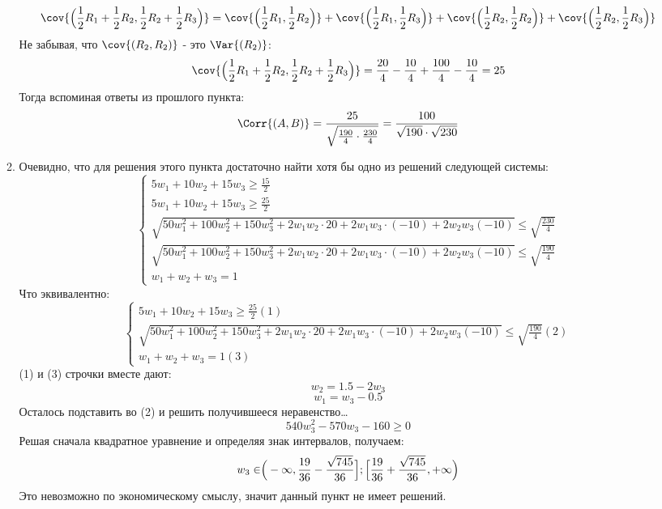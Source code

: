 \begin{enumerate}
\begin{enumerate}
\[	\]
	\[\cov{\Bigr(\frac{1}{2}R_{1} + \frac{1}{2}R_{2},\frac{1}{2}R_{2} + \frac{1}{2}R_{3}\Bigl)} = \cov{\Bigr(\frac{1}{2}R_{1},\frac{1}{2}R_{2}\Bigl)} + \cov{\Bigr(\frac{1}{2}R_{1}, \frac{1}{2}R_{3}\Bigl)} + \cov{\Bigr(\frac{1}{2}R_{2},\frac{1}{2}R_{2}\Bigl)} + \cov{\Bigr(\frac{1}{2}R_{2}, \frac{1}{2}R_{3}\Bigl)}\]
	Не забывая, что $\cov{(R_{2},R_{2})}$ - это $\Var{(R_{2})}$:
	\[\cov{\Bigr(\frac{1}{2}R_{1} + \frac{1}{2}R_{2},\frac{1}{2}R_{2} + \frac{1}{2}R_{3}\Bigl)} = \frac{20}{4} - \frac{10}{4} + \frac{100}{4} - \frac{10}{4} = 25\]
	Тогда вспоминая ответы из прошлого пункта:
	\[\Corr{(A, B)} = \frac{25}{\sqrt{\frac{190}{4}\cdot \frac{230}{4}}} = \frac{100}{\sqrt{190} \cdot \sqrt{230}}\]
	\item Очевидно, что для решения этого пункта достаточно найти хотя бы одно из решений следующей системы:
	\begin{equation*}
	\begin{cases}
	5w_{1} + 10w_{2} + 15w_{3} \ge \frac{15}{2}\\
	5w_{1} + 10w_{2} + 15w_{3} \ge \frac{25}{2}\\
	\sqrt{50w_{1}^{2} + 100w_{2}^{2} + 150w_{3}^{2} +2w_{1}w_{2}\cdot20 + 2w_{1}w_{3}\cdot(-10) + 2w_{2}w_{3}(-10)} \le \sqrt{\frac{230}{4}}\\
	\sqrt{50w_{1}^{2} + 100w_{2}^{2} + 150w_{3}^{2} +2w_{1}w_{2}\cdot20 + 2w_{1}w_{3}\cdot(-10) + 2w_{2}w_{3}(-10)} \le \sqrt{\frac{190}{4}}\\
	w_{1} + w_{2} + w_{3} = 1
	\end{cases}
	\end{equation*}
	Что эквивалентно:
	\begin{equation*}
	\begin{cases}
	5w_{1} + 10w_{2} + 15w_{3} \ge \frac{25}{2} (1)\\
	\sqrt{50w_{1}^{2} + 100w_{2}^{2} + 150w_{3}^{2} +2w_{1}w_{2}\cdot20 + 2w_{1}w_{3}\cdot(-10) + 2w_{2}w_{3}(-10)} \le \sqrt{\frac{190}{4}} (2)\\
	w_{1} + w_{2} + w_{3} = 1 (3)
	\end{cases}
	\end{equation*}
	(1) и (3) строчки вместе дают:
	\[w_{2} = 1.5 - 2w_{3}\]
	\[w_{1} = w_{3} - 0.5\]
	Осталось подставить во (2) и решить получившееся неравенство\ldots
	\[540w_{3}^{2} - 570w_{3} - 160 \ge 0\]
	Решая сначала квадратное уравнение и определяя знак интервалов, получаем:
	\[w_{3} \in \Bigr(-\infty, \frac{19}{36} - \frac{\sqrt{745}}{36}\Bigl]; \Bigl[\frac{19}{36} + \frac{\sqrt{745}}{36}, +\infty\Bigl)\]
	Это невозможно по экономическому смыслу, значит данный пункт не имеет решений.
\end{enumerate}
\end{enumerate}
